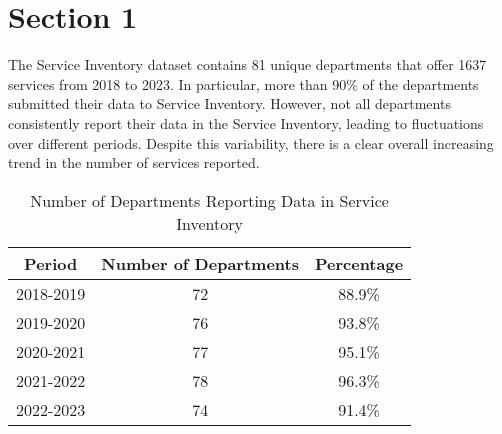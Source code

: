 \section{Section 1}

The Service Inventory dataset contains 81 unique departments that offer 1637 
services from 2018 to 2023. In particular, more than 90\% of the departments 
submitted their data to Service Inventory. However, not all departments 
consistently report their data in the Service Inventory, leading to fluctuations 
over different periods. Despite this variability, there is a clear overall 
increasing trend in the number of services reported.

\begin{table}[ht]
    \centering
    \begin{tabular}{|c|c|c|}
    \hline
    Period & Number of Departments & Percentage \\ \hline
    2018-2019 & 72 & 88.9\% \\ \hline
    2019-2020 & 76 & 93.8\% \\ \hline
    2020-2021 & 77 & 95.1\% \\ \hline
    2021-2022 & 78 & 96.3\% \\ \hline
    2022-2023 & 74 & 91.4\% \\ \hline
    \end{tabular}
    \caption{Number of Departments Reporting Data in Service Inventory}
\end{table}
